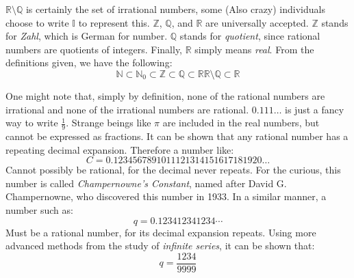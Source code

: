 \documentclass[crop=false,class=book,oneside]{standalone}
\begin{document}
            $\mathbb{R}\setminus\mathbb{Q}$ is certainly the set
            of irrational numbers, some (Also crazy) individuals
            choose to write $\mathbb{I}$ to represent this.
            $\mathbb{Z}$, $\mathbb{Q}$, and $\mathbb{R}$ are
            universally accepted. $\mathbb{Z}$ stands for
            \textit{Zahl}, which is German for number.
            $\mathbb{Q}$ stands for \textit{quotient}, since
            rational numbers are quotients of integers. Finally,
            $\mathbb{R}$ simply means \textit{real}.
            From the definitions given, we have the
            following:
            \begin{subequations}
                \begin{equation}
                    \mathbb{N}
                    \subset\mathbb{N}_{0}
                    \subset\mathbb{Z}
                    \subset\mathbb{Q}
                    \subset\mathbb{R}
                \end{equation}
                \begin{equation}
                    \mathbb{R}\setminus\mathbb{Q}
                    \subset\mathbb{R}
                \end{equation}
            \end{subequations}
        \begin{remark}
        One might note that, simply by definition, none of the
        rational numbers are irrational and none of the
        irrational numbers are rational.
            $0.111\hdots$ is just a fancy way to write $\frac{1}{9}$.
            Strange beings like $\pi$ are included in the real numbers,
            but cannot be expressed as fractions. It can be shown that
            any rational number has a repeating decimal expansion.
            Therefore a number like:
            \begin{equation}
                C=0.1234567891011121314151617181920\dots
            \end{equation}
            Cannot possibly be rational, for the decimal never repeats.
            For the curious, this number is called
            \textit{Champernowne's Constant}, named after David
            G. Champernowne, who discovered this number in 1933.
            In a similar manner, a number such as:
            \begin{equation}
                q=0.123412341234\cdots
            \end{equation}
            Must be a rational number, for its decimal expansion
            repeats. Using more advanced methods from the study
            of \textit{infinite series}, it can be shown that:
            \begin{equation}
                q=\frac{1234}{9999}
            \end{equation}
        \end{remark}
\end{document}
